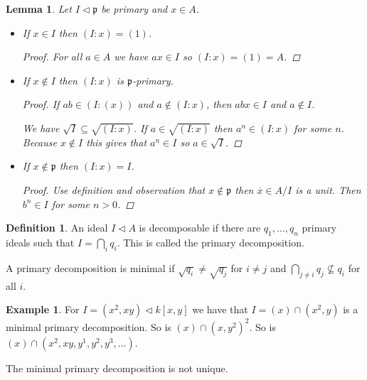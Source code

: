 \documentclass{article}
\newcommand{\primeid}{\mathfrak{p}}
\newcommand{\ideal}{\triangleleft}
\newtheorem{lemma}[theorem]{Lemma}
\theoremstyle{definition}
\newtheorem{definition}[theorem]{Definition}
\newtheorem{example}[theorem]{Example}
\begin{document}
\begin{lemma}
    Let \(I\ideal\primeid\) be primary and \(x\in A\).
    \begin{itemize}
        \item If \(x\in I\) then \((I:x)=(1)\).

              \begin{proof}
                  For all \(a\in A\) we have \(ax\in I\) so \((I:x)=(1)=A\).
              \end{proof}

        \item If \(x\notin I\) then \((I:x)\) is \(\primeid\)-primary.

              \begin{proof}
                  If \(ab\in(I:(x))\) and \(a\notin(I:x)\), then \(abx\in I\)
                  and \(a\notin I\).

                  We have \(\sqrt{I}\subseteq\sqrt{(I:x)}\). If
                  \(a\in\sqrt{(I:x)}\) then \(a^{n}\in(I:x)\) for some \(n\).
                  Because \(x\notin I\) this gives that \(a^{n}\in I\) so
                  \(a\in\sqrt{I}\).
              \end{proof}

        \item If \(x\notin\primeid\) then \((I:x)=I\).

              \begin{proof}
                  Use definition and observation that \(x\notin\primeid\) then
                  \(\overline{x}\in A/I\) is a unit. Then \(b^{n}\in I\) for
                  some \(n>0\).
              \end{proof}
    \end{itemize}
\end{lemma}

\begin{definition}
    An ideal \(I\ideal A\) is decomposable if there are
    \(q_{1},\ldots,q_{n}\) primary ideals such that \(I=\bigcap_{i}q_{i}\).
    This is called the primary decomposition.

    A primary decomposition is minimal if \(\sqrt{q_{i}}\neq\sqrt{q_{j}}\) for
    \(i\neq j\) and \(\bigcap_{j\neq i}q_{j}\nsubseteq q_{i}\) for all \(i\).
\end{definition}

\begin{example}
    For \(I=(x^{2},xy)\ideal k[x,y]\) we have that \(I=(x)\cap (x^{2},y)\) is a
    minimal primary decomposition. So is \((x)\cap(x,y^{2})^{2}\). So is
    \((x)\cap(x^{2},xy,y^{1},y^{2},y^{3},\ldots)\).

    The minimal primary decomposition is not unique.
\end{example}
\end{document}
